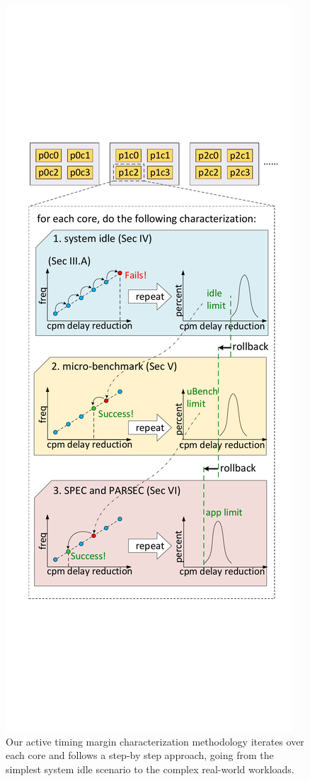 \begin{figure}[H]
  \centering
  \includegraphics[trim=10 280 10 280,clip,width=.75\linewidth]{graphs/process//profile-flow/profile-flow.pdf}
  \caption{Our active timing margin characterization methodology iterates over each core and follows a step-by step approach, going from the simplest system idle scenario to the complex real-world workloads.}
  \label{fig:methodology}
\end{figure}

